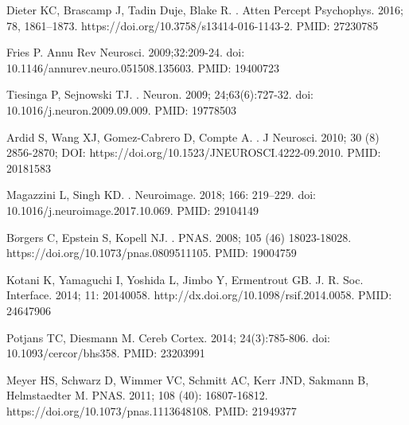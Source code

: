 \documentclass[10pt,letterpaper]{article}
\begin{document}
\begin{thebibliography}{10}
Dieter KC, Brascamp J, Tadin Duje, Blake R.
.
\newblock Atten Percept Psychophys. 2016; 78, 1861–1873. https://doi.org/10.3758/s13414-016-1143-2. PMID: 27230785

Fries P.
\newblock Annu Rev Neurosci. 2009;32:209-24. doi: 10.1146/annurev.neuro.051508.135603. PMID: 19400723

Tiesinga P, Sejnowski TJ.
.
\newblock Neuron. 2009; 24;63(6):727-32. doi: 10.1016/j.neuron.2009.09.009. PMID: 19778503

Ardid S, Wang XJ, Gomez-Cabrero D, Compte A.
.
\newblock J Neurosci. 2010; 30 (8) 2856-2870; DOI: https://doi.org/10.1523/JNEUROSCI.4222-09.2010. PMID: 20181583

Magazzini L, Singh KD.
.
\newblock Neuroimage. 2018; 166: 219–229. doi: 10.1016/j.neuroimage.2017.10.069. PMID: 29104149

B$\ddot{o}$rgers C, Epstein S, Kopell NJ.
.
\newblock PNAS. 2008; 105 (46) 18023-18028. https://doi.org/10.1073/pnas.0809511105. PMID: 19004759

Kotani K, Yamaguchi I, Yoshida L, Jimbo Y, Ermentrout GB.
\newblock J. R. Soc. Interface. 2014; 11: 20140058. http://dx.doi.org/10.1098/rsif.2014.0058. PMID: 24647906

Potjans TC, Diesmann M.
\newblock Cereb Cortex. 2014; 24(3):785-806. doi: 10.1093/cercor/bhs358. PMID: 23203991

Meyer HS, Schwarz D, Wimmer VC, Schmitt AC, Kerr JND, Sakmann B, Helmstaedter M.
\newblock PNAS. 2011; 108 (40): 16807-16812. https://doi.org/10.1073/pnas.1113648108. PMID: 21949377


\end{thebibliography}
\end{document}
